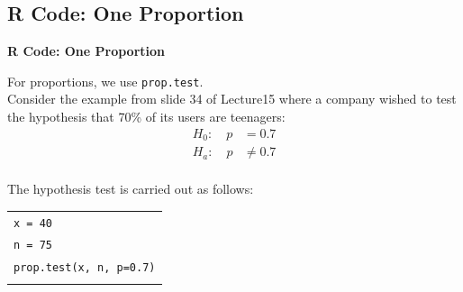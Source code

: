 \documentclass[compress]{beamer}        %
\makeatletter
\newcommand{\tcb}{\textcolor{beamer@blendedblue}}
\makeatother
\begin{document}
\subsection{R Code: One Proportion}
\begin{frame}{\bf \tcb{R Code: One Proportion}}

For proportions, we use \texttt{prop.test}.\\[0.5cm]

Consider the example from slide 34 of Lecture15 where a company wished to test the hypothesis that 70\% of its users are teenagers:
\begin{align*}
H_0: \quad p &= 0.7\\[0.2cm]
H_a: \quad p &\ne 0.7\\[-0.5cm]
\end{align*}

The hypothesis test is carried out as follows:\\[0.3cm]
\begin{tabular}{|l|}
\hline
\texttt{x = 40}\\
\texttt{n = 75}\\[0.2cm]
\texttt{prop.test(x, n, p=0.7)}\\
\hline
\multicolumn{1}{c}{}\\[0.2cm]
\end{tabular}


\end{frame}
\end{document}

